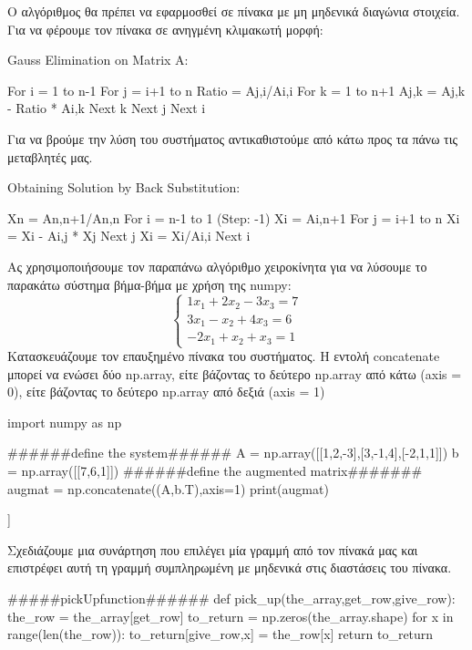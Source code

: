 Ο αλγόριθμος θα πρέπει να εφαρμοσθεί σε πίνακα με μη μηδενικά διαγώνια στοιχεία. Για να φέρουμε τον πίνακα σε ανηγμένη κλιμακωτή μορφή:
\en 
\begin{codeout}
Gauss Elimination on Matrix A:

For i = 1 to n-1
    For j = i+1 to n
         Ratio = Aj,i/Ai,i
         For k = 1 to n+1
              Aj,k = Aj,k - Ratio * Ai,k
         Next k
    Next j
Next i
\end{codeout}
\gr 
Για να βρούμε την λύση του συστήματος αντικαθιστούμε από κάτω προς τα πάνω τις μεταβλητές μας.
\en
\begin{codeout}
Obtaining Solution by Back Substitution:

Xn = An,n+1/An,n
For i = n-1 to 1 (Step: -1)
     Xi = Ai,n+1
     For j = i+1 to n
         Xi = Xi - Ai,j * Xj
     Next j
     Xi = Xi/Ai,i
Next i
\end{codeout}
\gr
Ας χρησιμοποιήσουμε τον παραπάνω αλγόριθμο χειροκίνητα για να λύσουμε το παρακάτω σύστημα βήμα-βήμα με χρήση της {\en numpy}:
\begin{equation}
\left\{\begin{array}{l}
1 x_1+2 x_2-3x_3=7 \\
3 x_1- x_2+4x_3=6 \\
-2 x_1+ x_2+x_3=1
\end{array}\right.
\end{equation}
Κατασκευάζουμε τον επαυξημένο πίνακα του συστήματος. Η εντολή {\en concatenate} μπορεί να ενώσει δύο {\en np.array}, είτε βάζοντας το δεύτερο {\en np.array} από κάτω ({\en axis = 0}), είτε βάζοντας το δεύτερο  {\en np.array} από δεξιά ({\en axis = 1})
\en
\begin{python}
import numpy as np

######define the system######
A = np.array([[1,2,-3],[3,-1,4],[-2,1,1]])
b = np.array([[7,6,1]])
######define the augmented matrix#######
augmat = np.concatenate((A,b.T),axis=1)
print(augmat)
\end{python}
\vspace*{-0.7cm}
\begin{codeout}
[[ 1  2 -3  7]
 [ 3 -1  4  6]
 [-2  1  1  1]]
\end{codeout}
\gr
Σχεδιάζουμε μια συνάρτηση που επιλέγει μία γραμμή από τον πίνακά μας και επιστρέφει αυτή τη γραμμή συμπληρωμένη με μηδενικά στις διαστάσεις του πίνακα.
\en
\begin{python}
#####pickUpfunction######
def pick_up(the_array,get_row,give_row):
    the_row = the_array[get_row]
    to_return = np.zeros(the_array.shape)
    for x in range(len(the_row)):
        to_return[give_row,x] = the_row[x]
    return to_return
\end{python}
\gr 

